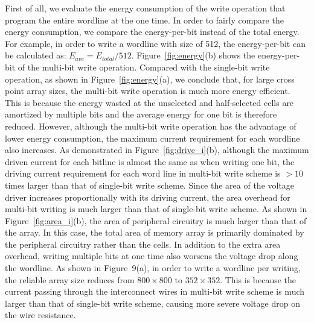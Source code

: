 First of all, we evaluate the energy consumption of the write operation
that program the entire wordline at the one time. In order to fairly
compare the energy consumption, we compare the energy-per-bit instead of
the total energy. For example, in order to write a wordline with size of
512, the energy-per-bit can be calculated as: $E_{ave}=E_{total}/512$.
Figure~\ref{fig:energy}(b) shows the energy-per-bit of the multi-bit write
operation. Compared with the single-bit write operation, as shown in
Figure~\ref{fig:energy}(a), we conclude that, for large cross point array
sizes, the multi-bit write operation is much more energy efficient. This
is because the energy wasted at the unselected and half-selected cells are
amortized by multiple bits and the average energy for one bit is therefore
reduced. However, although the multi-bit write operation has the advantage
of lower energy consumption, the maximum current requirement for each
wordline also increases. As demonstrated in Figure~\ref{fig:drive_i}(b),
although the maximum driven current for each bitline is almost the same as
when writing one bit, the driving current requirement for each word line
in multi-bit write scheme is $>10$ times larger than that of single-bit
write scheme. Since the area of the voltage driver increases
proportionally with its driving current, the area overhead for multi-bit
writing is much larger than that of single-bit write scheme. As shown in
Figure~\ref{fig:area_i}(b), the area of peripheral circuitry is much
larger than that of the array. In this case, the total area of memory
array is primarily dominated by the peripheral circuitry rather than the
cells.
In addition to the extra area overhead, writing multiple bits at one time
also worsens the voltage drop along the wordline. As shown in Figure~9(a),
in order to write a wordline per writing, the reliable array size reduces
from $800 \times 800$ to $352 \times 352$. This is because the current
passing through the interconnect wires in multi-bit write scheme is much
larger than that of single-bit write scheme, causing more severe voltage
drop on the wire resistance.

